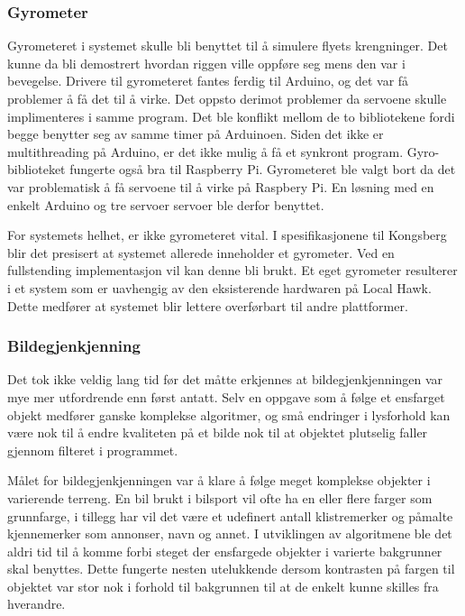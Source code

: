 \subsubsection{Gyrometer}
Gyrometeret i systemet skulle bli benyttet til å simulere flyets krengninger. Det kunne da bli demostrert hvordan riggen ville oppføre seg mens den var i bevegelse. Drivere til gyrometeret fantes ferdig til Arduino, og det var få problemer å få det til å virke. Det oppsto derimot problemer da servoene skulle implimenteres i samme program. Det ble konflikt mellom de to bibliotekene fordi begge benytter seg av samme timer på Arduinoen. Siden det ikke er multithreading på Arduino, er det ikke mulig å få et synkront program. Gyro-biblioteket fungerte også bra til Raspberry Pi. Gyrometeret ble valgt bort da det var problematisk å få servoene til å virke på Raspbery Pi. En løsning med en enkelt Arduino og tre servoer servoer ble derfor benyttet. 

For systemets helhet, er ikke gyrometeret vital. I spesifikasjonene til Kongsberg blir det presisert at systemet allerede inneholder et gyrometer. Ved en fullstending implementasjon vil kan denne bli brukt. Et eget gyrometer resulterer i et system som er uavhengig av den eksisterende hardwaren på Local Hawk. Dette medfører at systemet blir lettere overførbart til andre plattformer.

\subsubsection{Bildegjenkjenning}

Det tok ikke veldig lang tid før det måtte erkjennes at bildegjenkjenningen var mye mer utfordrende enn først antatt. Selv en oppgave som å følge et ensfarget objekt medfører ganske komplekse algoritmer, og små endringer i lysforhold kan være nok til å endre kvaliteten på et bilde nok til at objektet plutselig faller gjennom filteret i programmet.

Målet for bildegjenkjenningen var å klare å følge meget komplekse objekter i varierende terreng. En bil brukt i bilsport vil ofte ha en eller flere farger som grunnfarge, i tillegg har vil det være et udefinert antall klistremerker og påmalte kjennemerker som annonser, navn og annet. I utviklingen av algoritmene ble det aldri tid til å komme forbi steget der ensfargede objekter i varierte bakgrunner skal benyttes. Dette fungerte nesten utelukkende dersom kontrasten på fargen til objektet var stor nok i forhold til bakgrunnen til at de enkelt kunne skilles fra hverandre.

